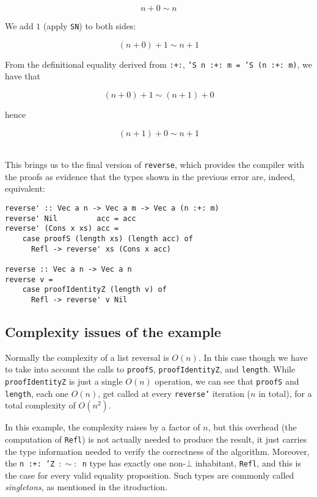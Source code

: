 $$
n+0 \sim n
$$

We add $1$ (apply \texttt{SN}) to both sides:

$$
(n+0)+1 \sim n+1
$$

From the definitional equality derived from \texttt{:+:}, \texttt{'S n :+: m = 'S (n :+: m)}, we have that

$$
(n+0)+1 \sim (n+1)+0
$$

hence

$$
(n+1) + 0 \sim n+1
$$

\fbox{\phantom{\rule{.7ex}{.7ex}}} \\ %

This brings us to the final version of \texttt{reverse}, which provides the compiler with the proofs as evidence that the types shown in the previous error are, indeed, equivalent:

\begin{lstlisting}[label=lst:reversal-final,caption=Length-indexed vector reversal]
reverse' :: Vec a n -> Vec a m -> Vec a (n :+: m)
reverse' Nil         acc = acc
reverse' (Cons x xs) acc =
    case proofS (length xs) (length acc) of
      Refl -> reverse' xs (Cons x acc)

reverse :: Vec a n -> Vec a n
reverse v =
    case proofIdentityZ (length v) of
      Refl -> reverse' v Nil
\end{lstlisting}

\subsection{Complexity issues of the example}
\label{subsec:complexity-issues}

Normally the complexity of a list reversal is $O(n)$.
In this case though we have to take into account the calls to \texttt{proofS}, \texttt{proofIdentityZ}, and \texttt{length}.
While \texttt{proofIdentityZ} is just a single $O(n)$ operation, we can see that \texttt{proofS} and \texttt{length}, each one $O(n)$, get called at every \texttt{reverse'} iteration ($n$ in total), for a total complexity of $O(n^2)$.

In this example, the complexity raises by a factor of $n$, but this overhead (the computation of \texttt{Refl}) is not actually needed to produce the result, it just carries the type information needed to verify the correctness of the algorithm.
Moreover, the \texttt{n :+: 'Z $:\sim:$ n} type has exactly one non-$\bot$ inhabitant, \texttt{Refl}, and this is the case for every valid equality proposition. Such types are commonly called \emph{singletons}, as mentioned in the itroduction.

